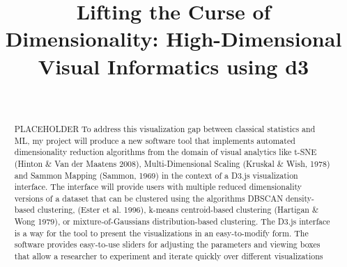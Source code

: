 \documentclass{sigchi}
\def\plaintitle{Lifting the Curse of Dimensionality: High-Dimensional Visual Informatics using d3}
\begin{document}
\title{\plaintitle}

\author{%
  \\
}

\maketitle%

\begin{abstract}
PLACEHOLDER To address this visualization gap between classical statistics and ML, my project will produce a new software tool that implements automated dimensionality reduction algorithms from the domain of visual analytics like t-SNE (Hinton \& Van der Maatens 2008), Multi-Dimensional Scaling (Kruskal \& Wish, 1978) and Sammon Mapping (Sammon, 1969) in the context of a D3.js visualization interface. The interface will provide users with multiple reduced dimensionality versions of a dataset that can be clustered using the algorithms DBSCAN density-based clustering, (Ester et al. 1996), k-means centroid-based clustering (Hartigan \& Wong 1979), or mixture-of-Gaussians distribution-based clustering. The D3.js interface is a way for the tool to present the visualizations in an easy-to-modify form. The software provides easy-to-use sliders for adjusting the parameters and viewing boxes that allow a researcher to experiment and iterate quickly over different visualizations 
\end{abstract}%
%
%
%
\end{document}
